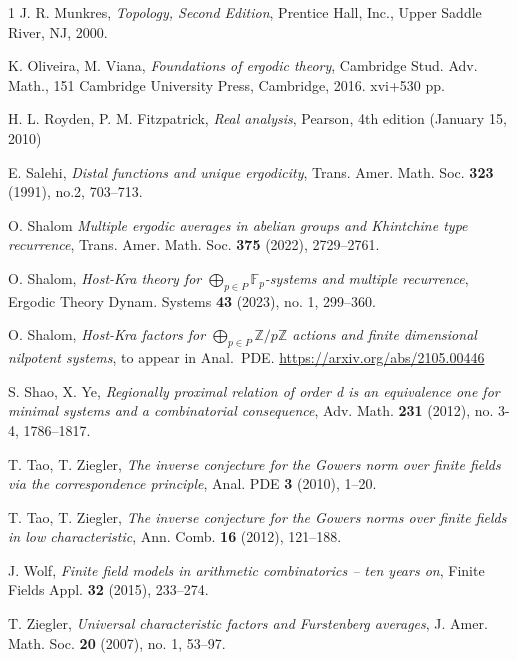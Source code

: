 \documentclass[a4paper,12pt,reqno]{amsart}
\theoremstyle{definition}
\newcommand{\mb}{\mathbb}
\begin{document}
\begin{thebibliography}{1}
 J. R. Munkres, \emph{Topology, Second Edition}, Prentice Hall, Inc., Upper Saddle River, NJ, 2000.

 K. Oliveira, M. Viana, \emph{Foundations of ergodic theory}, Cambridge Stud. Adv. Math., 151
Cambridge University Press, Cambridge, 2016. xvi+530 pp.

 H. L. Royden, P. M. Fitzpatrick, \emph{Real analysis}, Pearson, 4th edition (January 15, 2010)

 E. Salehi, \emph{Distal functions and unique ergodicity}, Trans. Amer. Math. Soc. \textbf{323} (1991), no.2, 703--713.

 O. Shalom \emph{Multiple ergodic averages in abelian groups and Khintchine type recurrence}, Trans. Amer. Math. Soc. \textbf{375} (2022), 2729--2761.

 O. Shalom, \emph{Host-Kra theory for $\bigoplus_{p\in P}\mb{F}_p$-systems and multiple recurrence}, Ergodic Theory Dynam. Systems \textbf{43} (2023), no. 1, 299--360. 

 O. Shalom, \emph{Host-Kra factors for $\bigoplus_{p\in P}\mb{Z}/p\mb{Z}$ actions and finite dimensional nilpotent systems}, to appear in Anal.\ PDE. \url{https://arxiv.org/abs/2105.00446}

 S. Shao, X. Ye, \emph{Regionally proximal relation of order d is an equivalence one for minimal systems and a combinatorial consequence},
Adv. Math. \textbf{231} (2012), no. 3-4, 1786--1817. 

 T. Tao, T. Ziegler, \emph{The inverse conjecture for the Gowers norm over finite fields via the correspondence principle}, Anal. PDE \textbf{3} (2010), 1--20.

 T. Tao, T. Ziegler, \emph{The inverse conjecture for the Gowers norms over finite fields in low characteristic}, Ann. Comb. \textbf{16} (2012), 121--188.

 J. Wolf, \emph{Finite field models in arithmetic combinatorics -- ten years on}, 
Finite Fields Appl. \textbf{32} (2015), 233--274. 

 T. Ziegler, \emph{Universal characteristic factors and Furstenberg averages}, J. Amer. Math. Soc. \textbf{20} (2007), no. 1, 53--97.

\end{thebibliography}
\end{document}
